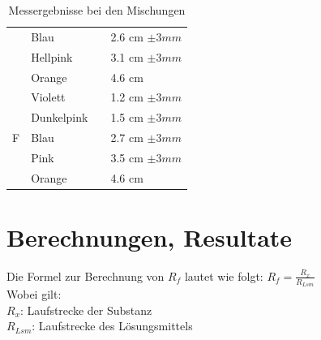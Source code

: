 \documentclass[11pt,paper=a4,final]{scrartcl}
\begin{document}
\begin{savenotes}
\begin{table}[ht!]
\begin{tabular}{|l|l|l|l|}
			& Blau		&				& 2.6 cm \(\pm 3 mm \)	\\
      			& Hellpink	& 				& 3.1 cm \(\pm 3 mm \)	\\
      			& Orange	&				& 4.6 cm		\\ \cline{1-2} \cline{4-4}
      \multirow{5}{*}{F}
			& Violett	&				& 1.2 cm \(\pm 3 mm \)	\\
      			& Dunkelpink 	&				& 1.5 cm \(\pm 3 mm \)	\\
      			& Blau		& 				& 2.7 cm \(\pm 3 mm \)	\\
      			& Pink		&				& 3.5 cm \(\pm 3 mm \)	\\
			& Orange	&				& 4.6 cm 		\\ \hline

    \end{tabular}
    \caption{Messergebnisse bei den Mischungen}
  \end{table}
\end{savenotes}

\section{Berechnungen, Resultate}
Die Formel zur Berechnung von \(R_f\) lautet wie folgt: \(R_f = \frac{R_x}{R_{Lsm}} \) \\
Wobei gilt:\\
\(R_x\): Laufstrecke der Substanz\\
\(R_{Lsm}\): Laufstrecke des L\"osungsmittels
\end{document}
